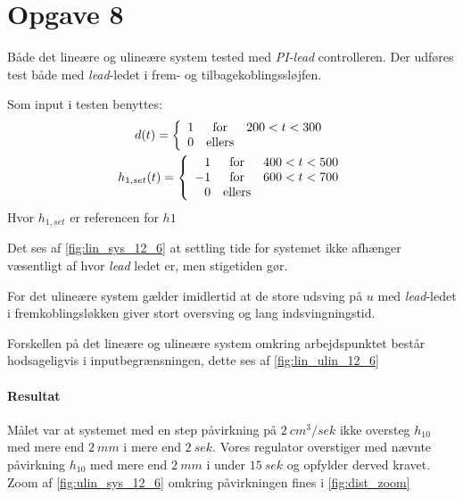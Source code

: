 \section{Opgave 8}
Både det lineære og ulineære system tested med \emph{PI-lead} controlleren.
Der udføres test både med \emph{lead}-ledet i frem- og tilbagekoblingssløjfen.

Som input i testen benyttes:
\begin{gather*}
d(t) = \left\{\begin{array}{r c l}
1 & \mbox{for} & 200<t<300\\
0 & \mbox{ellers} & 
\end{array}\right.\\
h_{1, set}(t) = \left\{\begin{array}{r c l}
 1 & \mbox{for} & 400<t<500\\
-1 & \mbox{for} & 600<t<700\\
 0 & \mbox{ellers} & 
\end{array}\right.\\
\end{gather*}
Hvor $h_{1, set}$ er referencen for $h1$

Det ses af \ref{fig:lin_sys_12_6} at settling tide for systemet ikke afhænger
væsentligt af hvor \emph{lead} ledet er, men stigetiden gør.

For det ulineære system gælder imidlertid at de store udsving på $u$ med
\emph{lead}-ledet i fremkoblingsløkken giver stort oversving og lang
indsvingningstid.

Forskellen på det lineære og ulineære system omkring arbejdspunktet består
hodsageligvis i inputbegrænsningen, dette ses af \ref{fig:lin_ulin_12_6}

\paragraph{Resultat}
	Målet var at systemet med en step påvirkning på $2~cm^3/sek$ ikke oversteg
	$h_{10}$ med mere end $2~mm$ i mere end $2~sek$. Vores regulator overstiger med nævnte
	påvirkning $h_{10}$ med mere end $2~mm$ i under $15~sek$ og opfylder derved
	kravet. Zoom af \ref{fig:ulin_sys_12_6} omkring påvirkningen fines i
	\ref{fig:dist_zoom}




